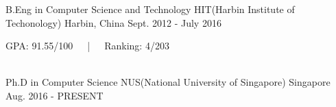 

\begin{cventries}

  \cventry
    {B.Eng in Computer Science and Technology} %
    {HIT(Harbin Institute of Techonology)} %
    {Harbin, China} %
    {Sept. 2012 - July 2016} %
    {
      \begin{cvitems} %
        \item {GPA: 91.55/100~~~|~~~Ranking: 4/203}
      \end{cvitems}
    }\\
    
    \cventry
    {Ph.D in Computer Science} %
    {NUS(National University of Singapore)} %
    {Singapore} %
    {Aug. 2016 - PRESENT} %
    {
    }
\end{cventries}
